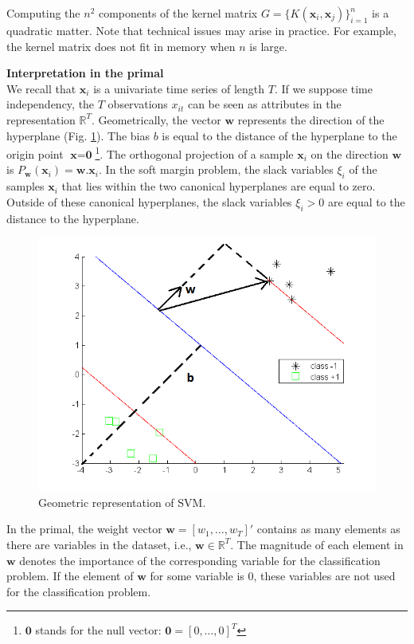 Computing the $n^2$ components of the kernel matrix $G = \{K(\textbf{x}_i
, \textbf{x}_j)\}_{i=1}^n$ is a quadratic matter. Note that technical issues may arise in practice. For example, the kernel matrix does not fit in memory when $n$ is large.


\noindent \textbf{Interpretation in the primal} \\
We recall that $\textbf{x}_i$ is a univariate time series of length $T$. If we suppose time independency, the $T$ observations $x_{it}$ can be seen as attributes in the representation $\mathbb{R}^T$. Geometrically, the vector $\textbf{w}$ represents the direction of the hyperplane (Fig. \ref{fig:SVM_interpretation}). The bias $b$ is equal to the distance of the hyperplane to the origin point $\textbf{x}=\textbf{0}$\footnote{$\textbf{0}$ stands for the null vector: $\textbf{0} = [0, \ldots ,0]^T$}. The orthogonal projection of a sample $\textbf{x}_i$ on the direction $\textbf{w}$ is $P_\textbf{w}(\textbf{x}_i) = \textbf{w}.\textbf{x}_i$. In the soft margin problem, the slack variables $\xi_i$ of the samples $\textbf{x}_i$ that lies within the two canonical hyperplanes are equal to zero. Outside of these canonical hyperplanes, the slack variables $\xi_i > 0$ are equal to the distance to the hyperplane.

\begin{figure}[h!]
	\centering
	\includegraphics[width=0.6\linewidth]{images/SVM_interpretation2}
	\caption{Geometric representation of SVM.}
	\label{fig:SVM_interpretation}
\end{figure}

In the primal, the weight vector $\textbf{w} = [w_1, \ldots, w_T]'$ contains as many elements as there are variables in the dataset, i.e., $\textbf{w} \in \mathbb{R}^T$. The magnitude of each element in $\textbf{w}$ denotes the importance of the corresponding variable for the classification problem. If the element of $\textbf{w}$ for some variable is 0, these variables are not used for the classification problem.

